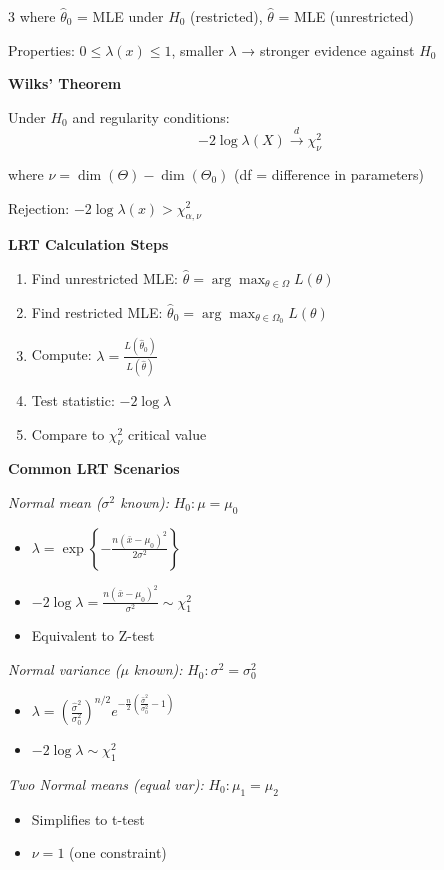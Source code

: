\documentclass[10pt,letterpaper]{article}
\begin{document}
\begin{multicols}{3}
where $\hat{\theta}_0$ = MLE under $H_0$ (restricted), $\hat{\theta}$ = MLE (unrestricted)

Properties: $0 \le \lambda(x) \le 1$, smaller $\lambda$ → stronger evidence against $H_0$

\textbf{Wilks' Theorem}

Under $H_0$ and regularity conditions:
$$-2\log\lambda(X) \xrightarrow{d} \chi^2_\nu$$

where $\nu = \dim(\Theta) - \dim(\Theta_0)$ (df = difference in parameters)

Rejection: $-2\log\lambda(x) > \chi^2_{\alpha, \nu}$

\textbf{LRT Calculation Steps}

\begin{enumerate}
\item Find unrestricted MLE: $\hat{\theta} = \arg\max_{\theta \in \Omega} L(\theta)$
\item Find restricted MLE: $\hat{\theta}_0 = \arg\max_{\theta \in \Omega_0} L(\theta)$
\item Compute: $\lambda = \frac{L(\hat{\theta}_0)}{L(\hat{\theta})}$
\item Test statistic: $-2\log\lambda$
\item Compare to $\chi^2_\nu$ critical value
\end{enumerate}

\textbf{Common LRT Scenarios}

\textit{Normal mean ($\sigma^2$ known):} $H_0: \mu = \mu_0$
\begin{itemize}
\item $\lambda = \exp\left\{-\frac{n(\bar{x}-\mu_0)^2}{2\sigma^2}\right\}$
\item $-2\log\lambda = \frac{n(\bar{x}-\mu_0)^2}{\sigma^2} \sim \chi^2_1$
\item Equivalent to Z-test
\end{itemize}

\textit{Normal variance ($\mu$ known):} $H_0: \sigma^2 = \sigma_0^2$
\begin{itemize}
\item $\lambda = \left(\frac{\hat{\sigma}^2}{\sigma_0^2}\right)^{n/2} e^{-\frac{n}{2}(\frac{\hat{\sigma}^2}{\sigma_0^2}-1)}$
\item $-2\log\lambda \sim \chi^2_1$
\end{itemize}

\textit{Two Normal means (equal var):} $H_0: \mu_1 = \mu_2$
\begin{itemize}
\item Simplifies to t-test
\item $\nu = 1$ (one constraint)
\end{itemize}


\end{multicols}
\end{document}
